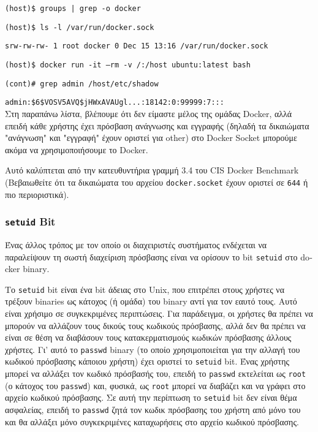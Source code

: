 \texttt{\textlatin{(host)\$ groups | grep -o docker}}

\texttt{\textlatin{(host)\$ ls -l /var/run/docker.sock}}

\texttt{\textlatin{srw-rw-rw- 1 root docker 0 Dec 15 13:16 /var/run/docker.sock}}

\texttt{\textlatin{(host)\$ docker run -it --rm -v /:/host ubuntu:latest bash}}

\texttt{\textlatin{(cont)\# grep admin /host/etc/shadow}}

\texttt{\textlatin{admin:\$6\$VOSV5AVQ\$jHWxAVAUgl...:18142:0:99999:7:::}} \\

Στη παραπάνω λίστα, βλέπουμε ότι δεν είμαστε μέλος της ομάδας
\textlatin{Docker}, αλλά επειδή κάθε χρήστης έχει πρόσβαση ανάγνωσης και
εγγραφής (δηλαδή τα δικαιώματα "ανάγνωση" και "εγγραφή" έχουν οριστεί για
\textlatin{other}) στο \textlatin{Docker Socket} μπορούμε ακόμα να
χρησιμοποιήσουμε το \textlatin{Docker}.

Αυτό καλύπτεται από την κατευθυντήρια γραμμή 3.4 του
\textlatin{CIS Docker Benchmark} (Βεβαιωθείτε ότι τα δικαιώματα του αρχείου
\texttt{\textlatin{docker.socket}} έχουν οριστεί σε \texttt{644} ή πιο
περιοριστικά).

\subsubsection{\texttt{\textlatin{setuid}} \textlatin{Bit}}

Ένας άλλος τρόπος με τον οποίο οι διαχειριστές συστήματος ενδέχεται να
παραλείψουν τη σωστή διαχείριση πρόσβασης είναι να ορίσουν το \textlatin{bit}
\texttt{\textlatin{setuid}} στο \textlatin{docker binary}.

Το \texttt{\textlatin{setuid}} \textlatin{bit} είναι ένα \textlatin{bit} άδειας
στο \textlatin{Unix}, που επιτρέπει στους χρήστες να τρέξουν
\textlatin{binaries} ως κάτοχος (ή ομάδα) του \textlatin{binary} αντί για τον
εαυτό τους. Αυτό είναι χρήσιμο σε συγκεκριμένες περιπτώσεις. Για παράδειγμα,
οι χρήστες θα πρέπει να μπορούν να αλλάζουν τους δικούς τους κωδικούς πρόσβασης,
αλλά δεν θα πρέπει να είναι σε θέση να διαβάσουν τους κατακερματισμούς κωδικών
πρόσβασης άλλους χρήστες. Γι' αυτό το \texttt{\textlatin{passwd}}
\textlatin{binary} (το οποίο χρησιμοποιείται για την αλλαγή του κωδικού
πρόσβασης κάποιου χρήστη) έχει οριστεί το \texttt{\textlatin{setuid}}
\textlatin{bit}. Ένας χρήστης μπορεί να αλλάξει τον κωδικό πρόσβασής του,
επειδή το \texttt{\textlatin{passwd}} εκτελείται ως \texttt{\textlatin{root}}
(ο κάτοχος του \texttt{\textlatin{passwd}}) και, φυσικά, ως
\texttt{\textlatin{root}} μπορεί να διαβάζει και να γράφει στο αρχείο κωδικού
πρόσβασης. Σε αυτή την περίπτωση το \texttt{\textlatin{setuid}} \textlatin{bit}
δεν είναι θέμα ασφαλείας, επειδή το \texttt{\textlatin{passwd}} ζητά τον κωδικ
πρόσβασης του χρήστη από μόνο του και θα αλλάξει μόνο συγκεκριμένες καταχωρήσεις
στο αρχείο κωδικού πρόσβασης.


